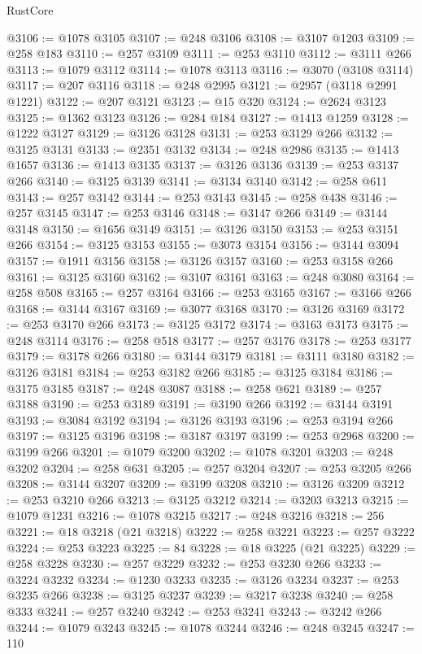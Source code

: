 \begin{lexlean}{RustCore}
\begin{coremodule}
@3106 := @1078 @3105
@3107 := @248 @3106
@3108 := @3107 @1203
@3109 := @258 @183
@3110 := @257 @3109
@3111 := @253 @3110
@3112 := @3111 @266
@3113 := @1079 @3112
@3114 := @1078 @3113
@3116 := @3070 (@3108 @3114)
@3117 := @207 @3116
@3118 := @248 @2995
@3121 := @2957 (@3118 @2991 @1221)
@3122 := @207 @3121
@3123 := @15 @320
@3124 := @2624 @3123
@3125 := @1362 @3123
@3126 := @284 @184
@3127 := @1413 @1259
@3128 := @1222 @3127
@3129 := @3126 @3128
@3131 := @253 @3129 @266
@3132 := @3125 @3131
@3133 := @2351 @3132
@3134 := @248 @2986
@3135 := @1413 @1657
@3136 := @1413 @3135
@3137 := @3126 @3136
@3139 := @253 @3137 @266
@3140 := @3125 @3139
@3141 := @3134 @3140
@3142 := @258 @611
@3143 := @257 @3142
@3144 := @253 @3143
@3145 := @258 @438
@3146 := @257 @3145
@3147 := @253 @3146
@3148 := @3147 @266
@3149 := @3144 @3148
@3150 := @1656 @3149
@3151 := @3126 @3150
@3153 := @253 @3151 @266
@3154 := @3125 @3153
@3155 := @3073 @3154
@3156 := @3144 @3094
@3157 := @1911 @3156
@3158 := @3126 @3157
@3160 := @253 @3158 @266
@3161 := @3125 @3160
@3162 := @3107 @3161
@3163 := @248 @3080
@3164 := @258 @508
@3165 := @257 @3164
@3166 := @253 @3165
@3167 := @3166 @266
@3168 := @3144 @3167
@3169 := @3077 @3168
@3170 := @3126 @3169
@3172 := @253 @3170 @266
@3173 := @3125 @3172
@3174 := @3163 @3173
@3175 := @248 @3114
@3176 := @258 @518
@3177 := @257 @3176
@3178 := @253 @3177
@3179 := @3178 @266
@3180 := @3144 @3179
@3181 := @3111 @3180
@3182 := @3126 @3181
@3184 := @253 @3182 @266
@3185 := @3125 @3184
@3186 := @3175 @3185
@3187 := @248 @3087
@3188 := @258 @621
@3189 := @257 @3188
@3190 := @253 @3189
@3191 := @3190 @266
@3192 := @3144 @3191
@3193 := @3084 @3192
@3194 := @3126 @3193
@3196 := @253 @3194 @266
@3197 := @3125 @3196
@3198 := @3187 @3197
@3199 := @253 @2968
@3200 := @3199 @266
@3201 := @1079 @3200
@3202 := @1078 @3201
@3203 := @248 @3202
@3204 := @258 @631
@3205 := @257 @3204
@3207 := @253 @3205 @266
@3208 := @3144 @3207
@3209 := @3199 @3208
@3210 := @3126 @3209
@3212 := @253 @3210 @266
@3213 := @3125 @3212
@3214 := @3203 @3213
@3215 := @1079 @1231
@3216 := @1078 @3215
@3217 := @248 @3216
@3218 := 256
@3221 := @18 @3218 (@21 @3218)
@3222 := @258 @3221
@3223 := @257 @3222
@3224 := @253 @3223
@3225 := 84
@3228 := @18 @3225 (@21 @3225)
@3229 := @258 @3228
@3230 := @257 @3229
@3232 := @253 @3230 @266
@3233 := @3224 @3232
@3234 := @1230 @3233
@3235 := @3126 @3234
@3237 := @253 @3235 @266
@3238 := @3125 @3237
@3239 := @3217 @3238
@3240 := @258 @333
@3241 := @257 @3240
@3242 := @253 @3241
@3243 := @3242 @266
@3244 := @1079 @3243
@3245 := @1078 @3244
@3246 := @248 @3245
@3247 := 110

\end{coremodule}
\end{lexlean}
